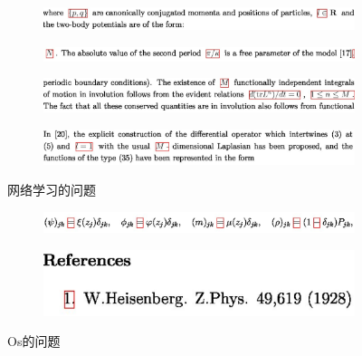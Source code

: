 \begin{figure}[hp]
    \centering
    \begin{subfigure}[b]{\linewidth}
    \centering
    \includegraphics[scale=0.3]{eps/a21.eps}
    \caption{\label{fig:fig1}}
    \end{subfigure}

    \begin{subfigure}[b]{\linewidth}
    \centering
    \includegraphics[scale=0.3]{eps/a22.eps}
    \caption{\label{fig:fig2}}
    \end{subfigure}

    \begin{subfigure}[b]{\linewidth}
    \centering
    \includegraphics[scale=0.3]{eps/a23.eps}
    \caption{\label{fig:fig2}}
    \end{subfigure}

    \begin{subfigure}[b]{\linewidth}
    \centering
    \includegraphics[scale=0.3]{eps/a24.eps}
    \caption{\label{fig:fig4}}
    \end{subfigure}

    \caption{网络学习的问题}
    \label{fig:label}
\end{figure}


\begin{figure}[hp]
    \centering

    \begin{subfigure}[b]{\linewidth}
    \centering
    \includegraphics[scale=0.3]{eps/os1.eps}
    \caption{\label{fig:fig1}}
    \end{subfigure}

    \begin{subfigure}[b]{\linewidth}
    \centering
    \includegraphics[scale=0.3]{eps/os2.eps}
    \caption{\label{fig:fig2}}
    \end{subfigure}


    \caption{Os的问题}
    \label{fig:label}
\end{figure}


